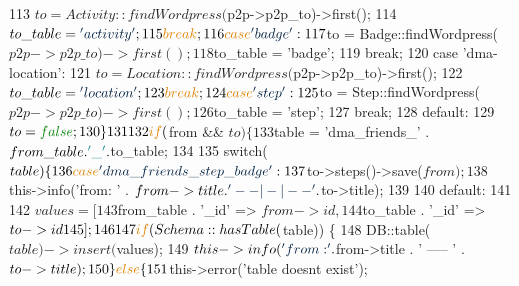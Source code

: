 \begin{DoxyCode}
113                     $to = Activity::findWordpress($p2p->p2p\_to)->first();
114                     $to\_table = \textcolor{stringliteral}{'activity'};
115                     \textcolor{keywordflow}{break};
116                 \textcolor{keywordflow}{case} \textcolor{stringliteral}{'badge'}:
117                     $to = Badge::findWordpress($p2p->p2p\_to)->first();
118                     $to\_table = \textcolor{stringliteral}{'badge'};
119                     \textcolor{keywordflow}{break};
120                 \textcolor{keywordflow}{case} \textcolor{stringliteral}{'dma-location'}:
121                     $to = Location::findWordpress($p2p->p2p\_to)->first();
122                     $to\_table = \textcolor{stringliteral}{'location'};
123                     \textcolor{keywordflow}{break};
124                 \textcolor{keywordflow}{case} \textcolor{stringliteral}{'step'}:
125                     $to = Step::findWordpress($p2p->p2p\_to)->first();
126                     $to\_table = \textcolor{stringliteral}{'step'}; 
127                     \textcolor{keywordflow}{break};
128                 \textcolor{keywordflow}{default}:
129                     $to = \textcolor{keyword}{false};
130             \}
131 
132             \textcolor{keywordflow}{if} ($from && $to) \{
133                 $table = \textcolor{stringliteral}{'dma\_friends\_'} . $from\_table . \textcolor{charliteral}{'\_'} . $to\_table;
134 
135                 \textcolor{keywordflow}{switch}($table) \{
136                     \textcolor{keywordflow}{case} \textcolor{stringliteral}{'dma\_friends\_step\_badge'}:
137                         $to->steps()->save($from);
138                         $this->info(\textcolor{stringliteral}{'from: '} . $from->title . \textcolor{stringliteral}{' --|-|-- '} . $to->title);
139 
140                     \textcolor{keywordflow}{default}:
141 
142                         $values = [
143                             $from\_table . \textcolor{stringliteral}{'\_id'}   => $from->id,
144                             $to\_table . \textcolor{stringliteral}{'\_id'}     => $to->id
145                         ];
146 
147                         \textcolor{keywordflow}{if} (Schema::hasTable($table)) \{
148                             DB::table($table)->insert($values);
149                             $this->info(\textcolor{stringliteral}{'from: '} . $from->title . \textcolor{stringliteral}{' ----- '} . $to->title);
150                         \} \textcolor{keywordflow}{else} \{
151                             $this->error(\textcolor{stringliteral}{'table doesnt exist'});

\end{DoxyCode}
